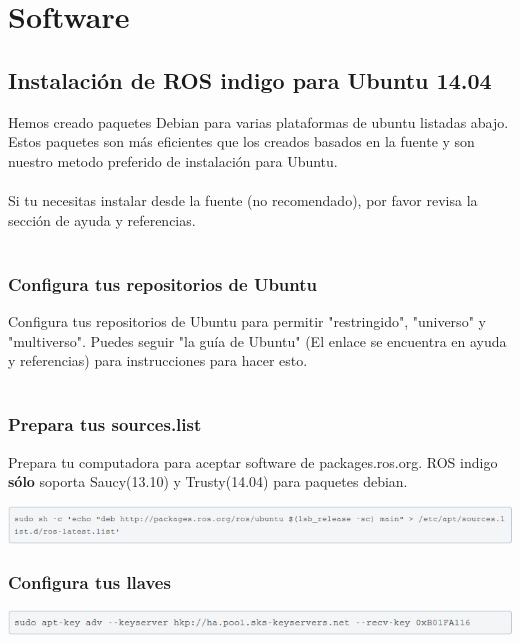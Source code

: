 \documentclass[a4paper,usenames,dvipsnames,svgnames,table]{book}
\begin{document}
\chapter{Software}

\section{Instalación de ROS indigo para Ubuntu 14.04}
Hemos creado paquetes Debian para varias plataformas de ubuntu listadas abajo. Estos paquetes son más eficientes que 
los creados basados en la fuente y son nuestro metodo preferido de instalación para Ubuntu.\\
\\
Si tu necesitas instalar desde la fuente (no recomendado), por favor revisa la sección de ayuda y referencias.\\
\\
\subsection{Configura tus repositorios de Ubuntu}
Configura tus repositorios de Ubuntu para permitir "restringido", "universo" y "multiverso". Puedes seguir "la guía de 
Ubuntu" (El enlace se encuentra en ayuda y referencias) para instrucciones para hacer esto.\\
\\
\subsection{Prepara tus sources.list}
Prepara tu computadora para aceptar software de packages.ros.org. ROS indigo \textbf{sólo} soporta Saucy(13.10) y 
Trusty(14.04) para paquetes debian.

\begin{center}
\includegraphics[width=1\textwidth]{Figures/Software/Install_ROS/Paso_1.png}
\end{center}

\subsection{Configura tus llaves}

\begin{center}
\includegraphics[width=1\textwidth]{Figures/Software/Install_ROS/Paso_2.png}
\end{center}
\end{document}
